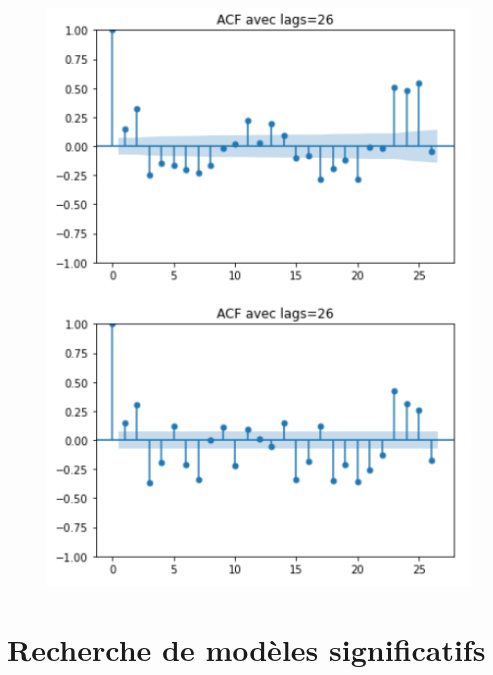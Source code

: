 \documentclass{beamer}
\theoremstyle{definition}
\begin{document}
\begin{frame}
\begin{minipage}[t]{1\linewidth}
\begin{minipage}[c]{0.48\linewidth}
\begin{figure}
\begin{center}
					\includegraphics[width=0.75\linewidth]{12.png}			
				\end{center}
				
		\end{figure}\end{minipage}
	\end{minipage}

\end{frame}

\section{Recherche de modèles significatifs}
\end{document}
